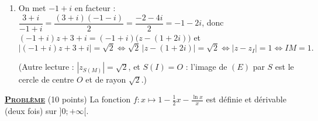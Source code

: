 \begin{enumerate}
      \[
         S' : z' = i\big[(-1+i)z + 3 + i\big] + 2 + 2i = (-1 - i)\,z + 1 + 5i.
      \]
      Comme $-1 - i = \sqrt{2}\,\expo{-i\frac{3\pi}{4}}$, $S'$ est une similitude directe de rapport $\sqrt{2}$
      (produit des rapports $1 \times \sqrt{2}$) et d'angle $-\frac{3\pi}{4}$ (somme $\frac{\pi}{2} + \frac{3\pi}{4} = \frac{5\pi}{4}$, \`a $2\pi$ pr\`es).
      Son centre a pour affixe $\dfrac{1 + 5i}{1 - (-1-i)} = \dfrac{1 + 5i}{2 + i} = \dfrac{(1+5i)(2-i)}{5} = \dfrac{7 + 9i}{5}$.
      \par\noindent{}
   \item {}
      On met $-1 + i$ en facteur : $\dfrac{3 + i}{-1 + i} = \dfrac{(3+i)(-1-i)}{2} = \dfrac{-2 - 4i}{2} = -1 - 2i$, donc
      $(-1 + i)z + 3 + i = (-1+i)\big(z - (1 + 2i)\big)$ et
      \[
         |(-1+i)z + 3 + i| = \sqrt{2} \iff \sqrt{2}\,|z - (1 + 2i)| = \sqrt{2} \iff |z - z_I| = 1 \iff IM = 1.
      \]
      \par\noindent{}
      (Autre lecture : $|z_{S(M)}| = \sqrt{2}$, et $S(I) = O$ : l'image de $(E)$ par $S$ est le cercle de centre $O$ et de rayon $\sqrt{2}$.)
\end{enumerate}
\noindent \underline{\textsc{\textbf{Probl\`eme}}} (10 points) \newline
La fonction $f : x \mapsto 1 - \frac{1}{2}x - \frac{\ln x}{x}$ est d\'efinie et d\'erivable (deux fois) sur $]0 ; +\infty[$.
